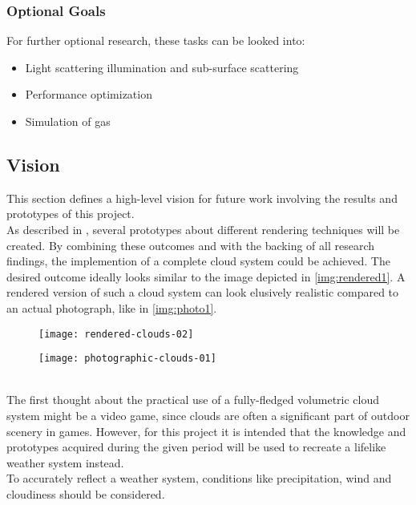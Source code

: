 \subsubsection{Optional Goals}
For further optional research, these tasks can be looked into:
\begin{itemize}
    \item Light scattering illumination and sub-surface scattering
    \item Performance optimization
    \item Simulation of gas
\end{itemize}

\clearpage

\subsection{Vision}
This section defines a high-level vision for future work involving the results and prototypes of this project. 
\\ 
As described in , several prototypes about different rendering techniques will be created.
By combining these outcomes and with the backing of all research findings, the implemention of a complete cloud system could be achieved. 
The desired outcome ideally looks similar to the image depicted in \autoref{img:rendered1}. A rendered version of such a cloud system can look elusively realistic compared to an actual photograph, like in \autoref{img:photo1}.
\begin{figure}[ht]
    \centering
        \begin{minipage}{0.47\linewidth}
            \texttt{[image: rendered-clouds-02]}
            \label{img:rendered1}        
        \end{minipage}        
    \hfill
        \begin{minipage}{0.47\linewidth}
            \texttt{[image: photographic-clouds-01]}
            \label{img:photo1}        
        \end{minipage}  
\end{figure}
\\
The first thought about the practical use of a fully-fledged volumetric cloud system might be a video game, since clouds are often a significant part of outdoor scenery in games.
However, for this project it is intended that the knowledge and prototypes acquired during the given period will be used to recreate a lifelike weather system instead.
\\
To accurately reflect a weather system, conditions like precipitation, wind and cloudiness should be considered.


